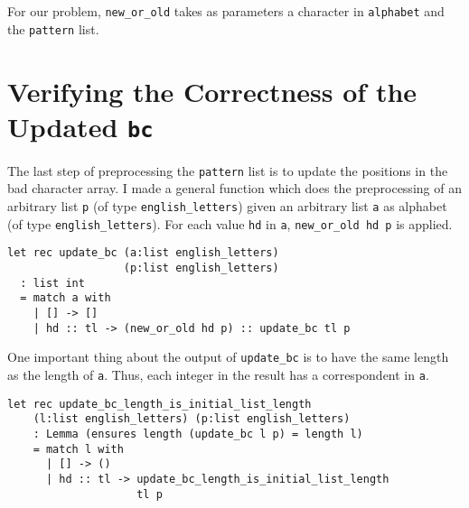 For our problem, \texttt{new\_or\_old} takes as parameters a character in \texttt{alphabet} and the \texttt{pattern} list.

\section{Verifying the Correctness of the Updated \texttt{bc}}

The last step of preprocessing the \texttt{pattern} list is to update the positions in the bad character array. I made a general function which does the preprocessing of an arbitrary list \texttt{p} (of type \texttt{english\_letters}) given an arbitrary list \texttt{a} as alphabet (of type \texttt{english\_letters}). For each value \texttt{hd} in \texttt{a}, \texttt{new\_or\_old hd p} is applied.

\begin{verbatim}
let rec update_bc (a:list english_letters) 
                  (p:list english_letters)
  : list int
  = match a with 
    | [] -> []
    | hd :: tl -> (new_or_old hd p) :: update_bc tl p
\end{verbatim}

One important thing about the output of \texttt{update\_bc} is to have the same length as the length of \texttt{a}. Thus, each integer in the result has a correspondent in \texttt{a}.

\begin{verbatim}
let rec update_bc_length_is_initial_list_length
    (l:list english_letters) (p:list english_letters)
    : Lemma (ensures length (update_bc l p) = length l)
    = match l with
      | [] -> ()
      | hd :: tl -> update_bc_length_is_initial_list_length
                    tl p
\end{verbatim}

